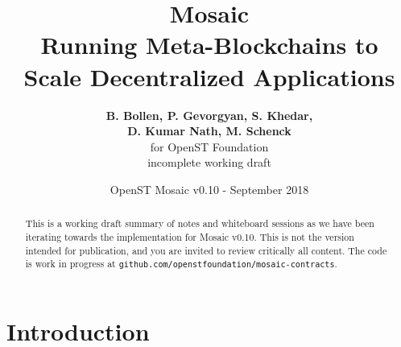 \documentclass[12pt,a4paper]{article}
\title{Mosaic\\\sc\Large{Running Meta-Blockchains to \\ Scale Decentralized Applications}}
\author{\textbf{B. Bollen, P. Gevorgyan, S. Khedar,}\\ \textbf{D. Kumar Nath, M. Schenck}\\ for OpenST Foundation \\ incomplete working draft}
\date{OpenST Mosaic v0.10 - September 2018}
\begin{document}
\maketitle

\begin{abstract}
This is a working draft summary of notes and whiteboard sessions as we have been iterating towards the implementation for Mosaic v0.10.
This is not the version intended for publication, and you are invited to review critically all content.
The code is work in progress at \verb|github.com/openstfoundation/mosaic-contracts|.
\end{abstract}

%
%
\section{Introduction}

%
%
%
% 
% 
% 
%
\end{document}
